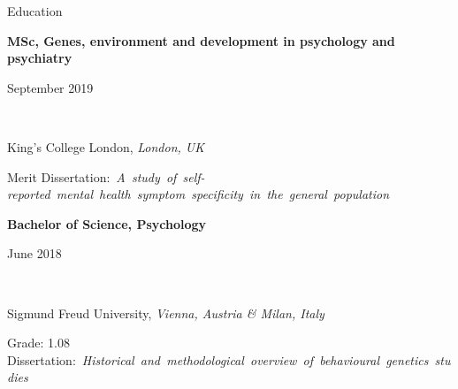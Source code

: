 \documentclass{resume2} %
\newcommand\textbox[1]{%
  \parbox{.48\textwidth}{#1}%
}
\begin{document}
\thispagestyle{plain}



\begin{rSection}{Education}



\textbox{\textbf{MSc, Genes, environment and development in psychology and psychiatry}\hfill}\textbox{\hfill September 2019}\\
\textbox{King's College London, \textit{London, UK}\hfill}{\hfill Merit}
\mbox{\small{Dissertation: \textit{A study of self-reported mental health symptom specificity in the general population}}}

\textbox{\textbf{Bachelor of Science, Psychology}\hfill}\textbox{\hfill June 2018}\\
\textbox{Sigmund Freud University, \textit{Vienna, Austria \& Milan, Italy}}{\hfill Grade: 1.08}
\mbox{\small{Dissertation: \textit{Historical and methodological overview of behavioural genetics studies}}}


\end{rSection}

\end{document}
